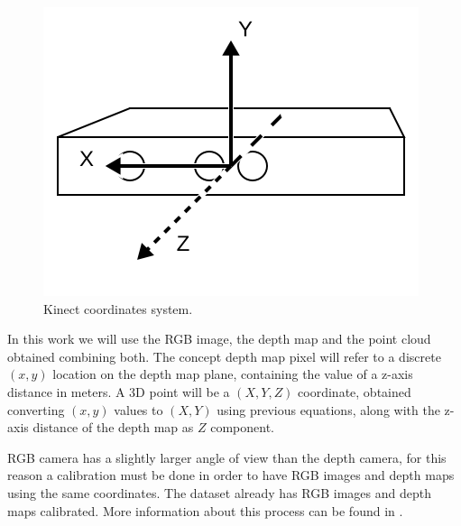 \begin{figure}[H]
\begin{center}
\includegraphics[scale=0.55]{images/coordinates}
\caption{Kinect coordinates system.}
\label{fig:coordinates}
\end{center}
\end{figure}

In this work we will use the RGB image, the depth map and the point cloud obtained combining both. The concept depth map pixel will 
refer to a discrete $(x,y)$  location on the depth map plane, containing the value of a z-axis distance in meters. A 3D point 
will be a $(X,Y,Z)$ coordinate, 
obtained converting $(x,y)$ values to $(X,Y)$ using previous equations, along with the z-axis distance of the depth map as $Z$ component.
 
RGB camera has a slightly larger angle of view than the depth camera, for this reason a calibration must be done 
in order to have RGB images and depth maps using the same coordinates. The dataset already has RGB images and depth maps 
calibrated. More information about 
this process can be found in \cite{sturm12iros}.

